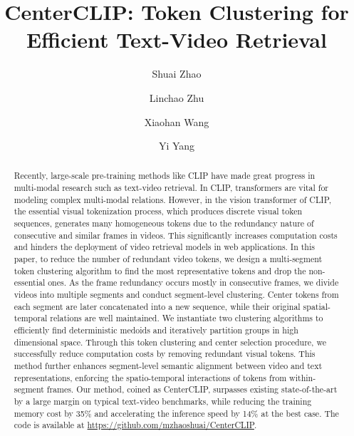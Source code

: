 \documentclass[sigconf]{acmart}
\begin{document}
\title{CenterCLIP: Token Clustering for Efficient Text-Video Retrieval}

\author{Shuai Zhao}

\author{Linchao Zhu}

\author{Xiaohan Wang}

\author{Yi Yang}





\begin{abstract}
Recently, large-scale pre-training methods like 
    CLIP have made great progress in multi-modal research such as text-video retrieval.
    In CLIP, transformers are vital for modeling complex multi-modal relations.
    However, in the vision transformer of CLIP, the essential visual tokenization process, which produces discrete visual token sequences, generates many homogeneous
	tokens due to the redundancy nature of consecutive
	and similar frames in videos.
    This significantly increases computation
	costs and hinders the deployment of video retrieval models in web applications.
	In this paper, to reduce the number of redundant video tokens,
    we design a multi-segment token clustering algorithm
	to find the most representative tokens and drop the non-essential ones.
	As the frame redundancy occurs mostly in consecutive frames, we divide videos into multiple segments and conduct segment-level clustering.
	Center tokens from each segment are later concatenated into a new sequence, while their original spatial-temporal relations are well maintained.
	We instantiate two clustering algorithms to efficiently find deterministic medoids and iteratively partition groups in high dimensional space.
	Through this token clustering and center selection procedure,
	we successfully reduce computation costs by removing redundant visual tokens.
	This method further enhances segment-level semantic alignment between video and text representations, enforcing the spatio-temporal interactions of tokens from within-segment frames.
	Our method, coined as CenterCLIP, surpasses existing state-of-the-art
	by a large margin on typical text-video benchmarks, while reducing the training memory cost by 35\%
	and accelerating the inference speed by 14\% at the best case.
	The code is available at \href{{https://github.com/mzhaoshuai/CenterCLIP}}{{https://github.com/mzhaoshuai/CenterCLIP}}.
\end{abstract}
\end{document}
